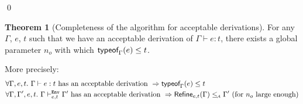 \documentclass[a4paper]{article}
\theoremstyle{definition}
\newtheorem{theorem}{Theorem}
\begin{document}
  \qed

  \begin{theorem}[Completeness of the algorithm for acceptable derivations]
    For any $\Gamma$, $e$, $t$ such that we have an acceptable derivation of $\Gamma \vdash e:t$, there exists a global parameter $n_o$
    with which $\textsf{typeof}_{\Gamma}(e) \leq t$.

    More precisely:
    \begin{align*}
      &\forall \Gamma, e, t.\ \Gamma \vdash e:t \text{ has an acceptable derivation } \Rightarrow \textsf{typeof}_{\Gamma}(e) \leq t\\
      &\forall \Gamma, \Gamma', e, t.\ \Gamma \vdash^{\texttt{Env}}_{e,t} \Gamma' \text{ has an acceptable derivation } \Rightarrow \textsf{Refine}_{e,t}(\Gamma) \leq_{\!\scriptscriptstyle\mathcal{A}} \Gamma' \text{ (for $n_o$ large enough)}
    \end{align*}
  \end{theorem}
\end{document}
